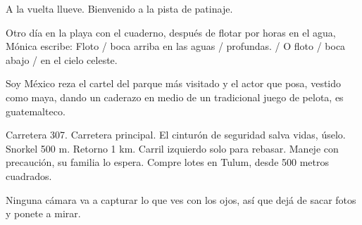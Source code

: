 \documentclass[11pt,twoside,openright,a6paper]{book}
\begin{document}
\vspace{0.5cm}
\hrulefill\hspace{0.2cm} \decofourleft\decofourright \hspace{0.2cm} \hrulefill
\vspace{0.5cm}

A la vuelta llueve. Bienvenido a la pista de patinaje.


\vspace{0.5cm}
\hrulefill\hspace{0.2cm} \decofourleft\decofourright \hspace{0.2cm} \hrulefill
\vspace{0.5cm}

 Otro día en la playa con el cuaderno, después de
flotar por horas en el agua, Mónica escribe: Floto / boca arriba en las
aguas / profundas. / O floto / boca abajo / en el cielo celeste.


\vspace{0.5cm}
\hrulefill\hspace{0.2cm} \decofourleft\decofourright \hspace{0.2cm} \hrulefill
\vspace{0.5cm}

Soy México reza el cartel del parque más visitado y el actor que posa,
vestido como maya, dando un caderazo en medio de un tradicional juego de
pelota, es guatemalteco.


\vspace{0.5cm}
\hrulefill\hspace{0.2cm} \decofourleft\decofourright \hspace{0.2cm} \hrulefill
\vspace{0.5cm}

Carretera 307. Carretera principal. El cinturón de seguridad salva
vidas, úselo. Snorkel 500  m. Retorno 1 km. Carril izquierdo solo para
rebasar. Maneje con precaución, su familia lo espera. Compre lotes en Tulum,
desde 500 metros cuadrados.


\vspace{0.5cm}
\hrulefill\hspace{0.2cm} \decofourleft\decofourright \hspace{0.2cm} \hrulefill
\vspace{0.5cm}

Ninguna cámara va a capturar lo que ves con los ojos, así que dejá de
sacar fotos y ponete a mirar.


\vspace{0.5cm}
\hrulefill\hspace{0.2cm} \decofourleft\decofourright \hspace{0.2cm} \hrulefill
\vspace{0.5cm}
\end{document}
